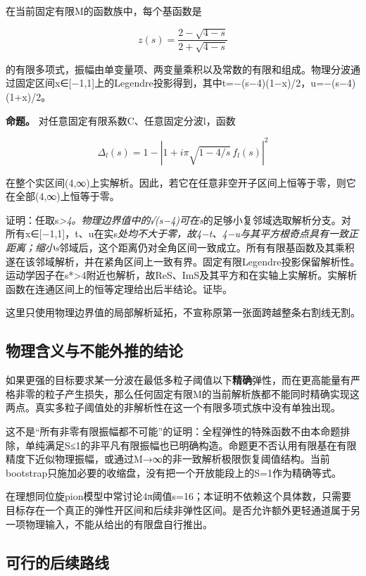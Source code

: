 \documentclass[
  10pt,
  a4paper,
]{article}
\begin{document}
在当前固定有限M的函数族中，每个基函数是

\[
z(s)=\frac{2-\sqrt{4-s}}{2+\sqrt{4-s}}
\]

的有限多项式，振幅由单变量项、两变量乘积以及常数的有限和组成。物理分波通过固定区间x∈{[}−1,1{]}上的Legendre投影得到，其中t=−(s−4)(1−x)/2，u=−(s−4)(1+x)/2。

\textbf{命题。} 对任意固定有限系数C、任意固定分波l，函数

\[
\Delta_l(s)=1-|1+i\pi\sqrt{1-4/s}\,f_l(s)|^2
\]

在整个实区间(4,∞)上实解析。因此，若它在任意非空开子区间上恒等于零，则它在全部(4,∞)上恒等于零。

证明：任取s\emph{\textgreater4。物理边界值中的√(s−4)可在s}的足够小复邻域选取解析分支。对所有x∈{[}−1,1{]}，t、u在实s\emph{处均不大于零，故4−t、4−u与其平方根奇点具有一致正距离；缩小s}邻域后，这个距离仍对全角区间一致成立。所有有限基函数及其乘积遂在该邻域解析，并在紧角区间上一致有界。固定有限Legendre投影保留解析性。运动学因子在s*\textgreater4附近也解析，故ReS、ImS及其平方和在实轴上实解析。实解析函数在连通区间上的恒等定理给出后半结论。证毕。

这里只使用物理边界值的局部解析延拓，不宣称原第一张面跨越整条右割线无割。

\subsection{物理含义与不能外推的结论}\label{ux7269ux7406ux542bux4e49ux4e0eux4e0dux80fdux5916ux63a8ux7684ux7ed3ux8bba}

如果更强的目标要求某一分波在最低多粒子阈值以下\textbf{精确}弹性，而在更高能量有严格非零的粒子产生损失，那么任何固定有限M的当前解析族都不能同时精确实现这两点。真实多粒子阈值处的非解析性在这一个有限多项式族中没有单独出现。

这不是``所有非零有限振幅都不可能''的证明：全程弹性的特殊函数不由本命题排除，单纯满足\textbar S\textbar≤1的非平凡有限振幅也已明确构造。命题更不否认用有限基在有限精度下近似物理振幅，或通过M→∞的非一致解析极限恢复阈值结构。当前bootstrap只施加必要的收缩盘，没有把一个开放能段上的\textbar S\textbar=1作为精确等式。

在理想同位旋pion模型中常讨论4π阈值s=16；本证明不依赖这个具体数，只需要目标存在一个真正的弹性开区间和后续非弹性区间。是否允许额外更轻通道属于另一项物理输入，不能从给出的有限盘自行推出。

\subsection{可行的后续路线}\label{ux53efux884cux7684ux540eux7eedux8defux7ebf}
\end{document}
